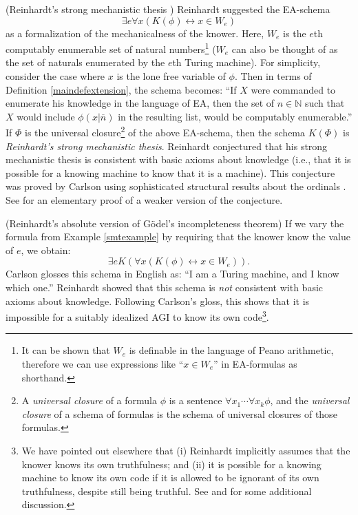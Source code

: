 \documentclass[runningheads]{llncs}
\begin{document}
\begin{example}
\label{smtexample}
    (Reinhardt's strong mechanistic thesis
    \cite{reinhardt1985absolute} \cite{reinhardt1986epistemic}
    \cite{carlson}) Reinhardt suggested the
    EA-schema
    \[\exists e \forall x ( K(\phi) \leftrightarrow x\in W_e)\]
    as a formalization of the mechanicalness of the knower. Here, $W_e$
    is the $e$th computably enumerable set of natural numbers\footnote{It can be
    shown that $W_e$ is definable in the language of Peano arithmetic, therefore we
    can use expressions like ``$x\in W_e$'' in EA-formulas as shorthand.}
    ($W_e$ can also
    be thought of as the set of naturals enumerated by the $e$th Turing machine).
    For simplicity, consider the case where $x$ is the lone free variable
    of $\phi$. Then in terms of Definition \ref{maindefextension}, the schema
    becomes:
    ``If $X$ were commanded to enumerate his knowledge in the language of EA,
    then the set of $n\in\mathbb N$ such that $X$ would include $\phi(x|\overline n)$
    in the resulting list, would be computably enumerable.''
    If $\Phi$ is the universal closure\footnote{A \emph{universal closure} of
    a formula $\phi$ is a sentence $\forall x_1\cdots\forall x_k\phi$,
    and the \emph{universal closure} of a schema of formulas is the schema
    of universal closures of those formulas.} of the above EA-schema, then the
    schema $K(\Phi)$ is \emph{Reinhardt's
    strong mechanistic thesis}. Reinhardt conjectured that his strong mechanistic
    thesis is consistent with basic axioms about knowledge (i.e., that it is
    possible for a knowing machine to know that it is a machine).
    This conjecture was proved by Carlson \cite{carlson} using sophisticated
    structural results about the ordinals \cite{carlson1999}.
    See \cite{alexander2015fast} for an elementary proof of a weaker
    version of the conjecture.
\end{example}

\begin{example}
\label{reinhardtnegativeexample}
  (Reinhardt's absolute version of G\"odel's incompleteness theorem)
  If we vary the formula from Example \ref{smtexample} by requiring that the
  knower know the value of $e$, we obtain:
  \[
    \exists e K(\forall x ( K(\phi) \leftrightarrow x\in W_e)).
  \]
  Carlson \cite{carlson} glosses this schema in English as:
  ``I am a Turing machine, and I know which one.''
  Reinhardt showed that this schema is \emph{not} consistent with basic
  axioms about knowledge. Following Carlson's gloss, this shows
  that it is impossible for a suitably idealized AGI to know its own code\footnote{We have
  pointed out elsewhere \cite{alexander2014machine} that (i) Reinhardt
  implicitly assumes that the knower knows its own truthfulness; and (ii)
  it is possible for a knowing machine to know its own code if it is allowed to
  be ignorant of its own truthfulness, despite still being truthful.
  See \cite{aldini2015self} and \cite{aldini2015theory} for some additional discussion.}.
\end{example}
\end{document}
